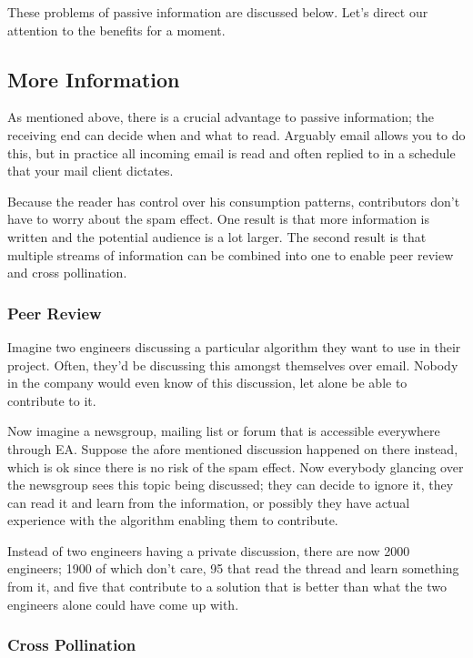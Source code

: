 \documentclass[twocolumn]{paper}
\begin{document}
These problems of passive information are discussed below. Let's
direct our attention to the benefits for a moment.

\subsection{More Information}

As mentioned above, there is a crucial advantage to passive
information; the receiving end can decide when and what to read.
Arguably email allows you to do this, but in practice all incoming
email is read and often replied to in a schedule that your mail
client dictates.

Because the reader has control over his consumption patterns,
contributors don't have to worry about the spam effect. One result
is that more information is written and the potential audience is a
lot larger. The second result is that multiple streams of
information can be combined into one to enable peer review and cross
pollination.

\subsubsection{Peer Review}

Imagine two engineers discussing a particular algorithm they want to
use in their project. Often, they'd be discussing this amongst
themselves over email. Nobody in the company would even know of this
discussion, let alone be able to contribute to it.

Now imagine a newsgroup, mailing list or forum that is accessible
everywhere through EA. Suppose the afore mentioned discussion
happened on there instead, which is ok since there is no risk of the
spam effect. Now everybody glancing over the newsgroup sees this
topic being discussed; they can decide to ignore it, they can read
it and learn from the information, or possibly they have actual
experience with the algorithm enabling them to contribute.

Instead of two engineers having a private discussion, there are now
2000 engineers; 1900 of which don't care, 95 that read the thread
and learn something from it, and five that contribute to a solution
that is better than what the two engineers alone could have come up
with.

\subsubsection{Cross Pollination}
\end{document}
